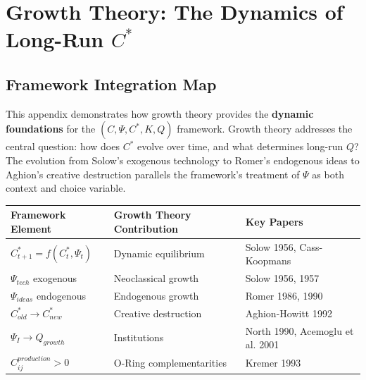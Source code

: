 \section{Growth Theory: The Dynamics of Long-Run $C^*$}
\label{app:growth-theory}

\subsection{Framework Integration Map}

This appendix demonstrates how growth theory provides the \textbf{dynamic foundations} 
for the $(C, \Psi, C^*, K, Q)$ framework. Growth theory addresses the central question: 
how does $C^*$ evolve over time, and what determines long-run $Q$? The evolution from 
Solow's exogenous technology to Romer's endogenous ideas to Aghion's creative destruction 
parallels the framework's treatment of $\Psi$ as both context and choice variable.

\begin{center}
\renewcommand{\arraystretch}{1.4}
\begin{tabular}{|l|l|l|}
\hline
\textbf{Framework Element} & \textbf{Growth Theory Contribution} & \textbf{Key Papers} \\
\hline
$C^*_{t+1} = f(C^*_t, \Psi_t)$ & Dynamic equilibrium & Solow 1956, Cass-Koopmans \\
$\Psi_{tech}$ exogenous & Neoclassical growth & Solow 1956, 1957 \\
$\Psi_{ideas}$ endogenous & Endogenous growth & Romer 1986, 1990 \\
$C^*_{old} \to C^*_{new}$ & Creative destruction & Aghion-Howitt 1992 \\
$\Psi_I \to Q_{growth}$ & Institutions & North 1990, Acemoglu et al. 2001 \\
$C_{ij}^{production} > 0$ & O-Ring complementarities & Kremer 1993 \\
\hline
\end{tabular}
\end{center}

